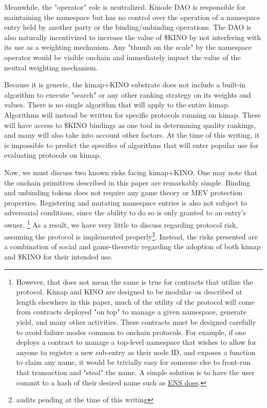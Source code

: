 \documentclass[runningheads]{llncs}
\begin{document}
Meanwhile, the "operator" role is neutralized.
Kinode DAO is responsible for maintaining the namespace but has no control over the operation of a namespace entry held by another party or the binding/unbinding operations.
The DAO is also naturally incentivized to increase the value of \$KINO by not interfering with its use as a weighting mechanism.
Any "thumb on the scale" by the namespace operator would be visible onchain and immediately impact the value of the neutral weighting mechanism.

Because it is generic, the kimap+KINO substrate does not include a built-in algorithm to execute "search" or any other ranking strategy on its weights and values.
There is no single algorithm that will apply to the entire kimap.
Algorithms will instead be written for specific protocols running on kimap.
These will have access to \$KINO bindings as one tool in determining quality rankings, and many will also take into account other factors.
At the time of this writing, it is impossible to predict the specifics of algorithms that will enter popular use for evaluating protocols on kimap.

Now, we must discuss two known risks facing kimap+KINO.
One may note that the onchain primitives described in this paper are remarkably simple.
Binding and unbinding tokens does not require any game theory or MEV protection properties.
Registering and mutating namespace entries is also not subject to adversarial conditions, since the ability to do so is only granted to an entry's owner.
\footnote{However, that does not mean the same is true for contracts that utilize the protocol.
Kimap and KINO are designed to be modular–as described at length elsewhere in this paper, much of the utility of the protocol will come from contracts deployed "on top" to manage a given namespace, generate yield, and many other activities.
These contracts must be designed carefully to avoid failure modes common to onchain protocols.
For example, if one deploys a contract to manage a top-level namespace that wishes to allow for anyone to register a new sub-entry as their node ID, and exposes a function to claim any name, it would be trivially easy for someone else to front-run that transaction and "steal" the name.
A simple solution is to have the user commit to a hash of their desired name such as \href{https://docs.ens.domains/registry/eth\#commit-reveal}{ENS does}.}
As a result, we have very little to discuss regarding protocol risk, assuming the protocol is implemented properly\footnote{audits pending at the time of this writing}.
Instead, the risks presented are a combination of social and game-theoretic regarding the adoption of both kimap and \$KINO for their intended use.
\end{document}
